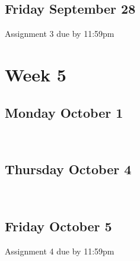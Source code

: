 \documentclass[]{book}
\let\originaltabular\tabular
\let\endoriginaltabular\endtabular
\renewenvironment{tabular}[1]{%
  \begingroup%
  \centering%
  \originaltabular{#1}}%
  {\endoriginaltabular\endgroup}
\theoremstyle{definition}
\theoremstyle{definition}
\theoremstyle{definition}
\theoremstyle{remark}
\begin{document}
\subsection{Friday September 28}\label{friday-september-28}

\begin{table}[H]
\centering
\begin{tabular}{l}
\hline
Assignment 3 due by 11:59pm\\
\hline
\end{tabular}
\end{table}

\section{Week 5}\label{week-5}

\subsection{Monday October 1}\label{monday-october-1}

\begin{table}[H]
\centering
\begin{tabular}{l}
\hline
\\
\hline
\end{tabular}
\end{table}

\subsection{Thursday October 4}\label{thursday-october-4}

\begin{table}[H]
\centering
\begin{tabular}{l}
\hline
\\
\hline
\end{tabular}
\end{table}

\subsection{Friday October 5}\label{friday-october-5}

\begin{table}[H]
\centering
\begin{tabular}{l}
\hline
Assignment 4 due by 11:59pm\\
\hline
\end{tabular}
\end{table}
\end{document}

